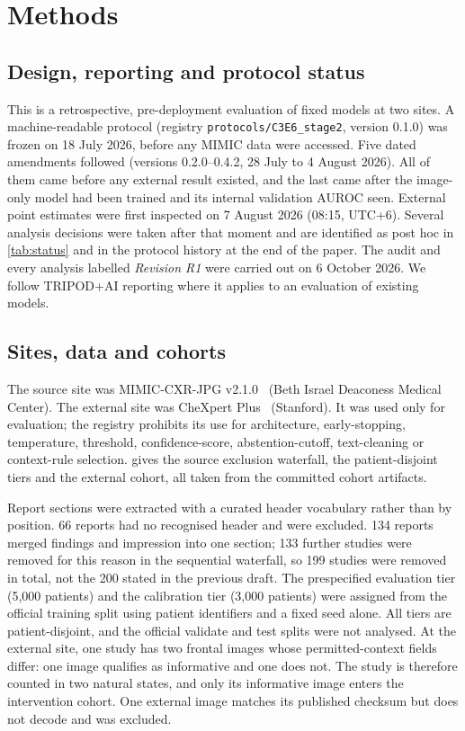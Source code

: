\section{Methods}
\label{sec:methods}

\subsection{Design, reporting and protocol status}
This is a retrospective, pre-deployment evaluation of fixed models at two
sites. A machine-readable protocol (registry
\texttt{protocols/C3E6\_stage2}, version 0.1.0) was frozen on 18 July 2026,
before any MIMIC data were accessed. Five dated amendments followed (versions
0.2.0--0.4.2, 28 July to 4 August 2026). All of them came before any external
result existed, and the last came after the image-only model had been trained
and its internal validation AUROC seen. External point estimates were first
inspected on 7 August 2026 (08:15, UTC+6). Several analysis decisions were
taken after that moment and are identified as post hoc in
\cref{tab:status} and in the protocol history at the end of the paper. The
audit and every analysis labelled \emph{Revision R1} were carried out on 6
October 2026. We follow TRIPOD+AI reporting where it applies to an evaluation
of existing models.

\subsection{Sites, data and cohorts}
The source site was MIMIC-CXR-JPG v2.1.0~\cite{johnson2019mimiccxrjpg,johnson2019mimiccxr}
(Beth Israel Deaconess Medical Center). The external site was CheXpert
Plus~\cite{chambon2024chexpertplus} (Stanford). It was used only for evaluation;
the registry prohibits its use for architecture, early-stopping, temperature,
threshold, confidence-score, abstention-cutoff, text-cleaning or context-rule
selection.  gives the source exclusion waterfall, the
patient-disjoint tiers and the external cohort, all taken from the committed
cohort artifacts.

Report sections were extracted with a curated header vocabulary rather than by
position. 66 reports had no recognised header and were excluded. 134 reports
merged findings and impression into one section; 133 further studies were
removed for this reason in the sequential waterfall, so 199 studies were removed
in total, not the 200 stated in the previous draft. The prespecified
evaluation tier (5,000 patients) and the calibration tier (3,000 patients) were
assigned from the official training split using patient identifiers and a
fixed seed alone. All tiers are patient-disjoint, and the official validate and
test splits were not analysed. At the external site, one study has two frontal
images whose permitted-context fields differ: one image qualifies as
informative and one does not. The study is therefore counted in two natural
states, and only its informative image enters the intervention cohort.
One external image matches its published checksum but does not decode and was
excluded.

